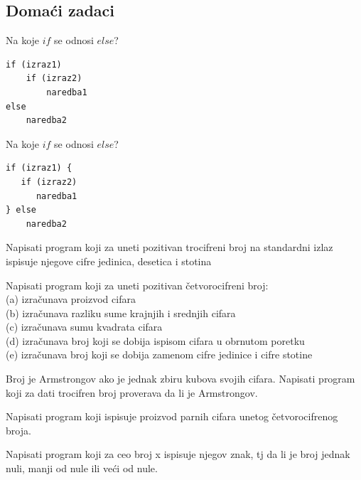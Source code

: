 \subsection{Domaći zadaci}
\begin{primer}
Na koje $if$ se odnosi $else$?
\begin{verbatim}
if (izraz1)
    if (izraz2)
        naredba1
else
    naredba2
\end{verbatim}
\end{primer}
\begin{primer}
Na koje $if$ se odnosi $else$?
\begin{verbatim}
if (izraz1) {
   if (izraz2)
      naredba1
} else
    naredba2
\end{verbatim}
\end{primer}

\begin{primer}
Napisati program koji za uneti pozitivan trocifreni broj na
standardni izlaz ispisuje njegove cifre jedinica, desetica i stotina
\end{primer}

\begin{primer}
Napisati program koji za uneti pozitivan četvorocifreni
broj:\\
(a) izračunava proizvod cifara\\
(b) izračunava razliku sume krajnjih i srednjih cifara\\
(c) izračunava sumu kvadrata cifara\\
(d) izračunava broj koji se dobija ispisom cifara u obrnutom poretku\\
(e) izračunava broj koji se dobija zamenom cifre jedinice i cifre stotine\\
\end{primer}

\begin{primer}
Broj je Armstrongov ako je jednak zbiru kubova svojih
cifara. Napisati program koji za dati trocifren broj proverava da li je Armstrongov.
\end{primer}

\begin{primer}
Napisati program koji ispisuje proizvod parnih cifara unetog
četvorocifrenog broja.
\end{primer}

\begin{primer}
Napisati program koji za ceo broj x ispisuje njegov
znak, tj da li je broj jednak nuli, manji od nule ili veći od nule.
\end{primer}

